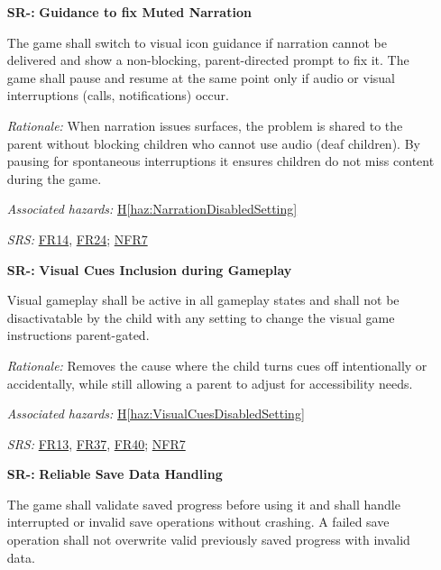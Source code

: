 \documentclass{article}
\newcounter{hazard}
\newcommand{\hazref}[1]{\hyperref[haz:#1]{H\ref*{haz:#1}}}
\newcounter{sr}
\newcommand{\srdef}[1]{\refstepcounter{sr}\label{sr:#1}\textbf{SR-\thesr:}}
\newcommand{\srsurl}{https://team-hindsight.github.io/ophthamology-game/SRS-IEEE/SRS.pdf}
\newcommand{\srsfrref}[2]{\href{\srsurl\#nameddest=#1}{FR#2}}
\newcommand{\srsnfrref}[2]{\href{\srsurl\#nameddest=#1}{NFR#2}}
\begin{document}
\begin{itemize}[leftmargin=1.5cm, labelwidth=1.3cm, labelsep=0.2cm,
  align=left, itemsep=1.2em, parsep=0.6em]
\textit{Rationale:}
Addresses the data-defect cause and removes quiz questions that don't 
match so the child never sees a question that cannot be answered correctly.

\textit{Associated hazards:}
\hazref{CorrectAnswerReveal}

\textit{SRS:} \srsfrref{FR_ValidQuestions}{16}

\item[\srdef{NarrationMuted}]
\textbf{Guidance to fix Muted Narration}

The game shall switch to visual icon guidance if narration cannot be 
delivered and show a non-blocking, parent-directed prompt to fix it. 
The game shall pause and resume at the same point only if audio or 
visual interruptions (calls, notifications) occur.

\textit{Rationale:}
When narration issues surfaces, the problem is shared to the parent without 
blocking children who cannot use audio (deaf children). By pausing for 
spontaneous interruptions it ensures children do not miss content during the game.

\textit{Associated hazards:}
\hazref{NarrationDisabledSetting}

\textit{SRS:} \srsfrref{FR_NarrationFallback}{14}, \srsfrref{FR_Suspend}{24}; \srsnfrref{NFR_Accessibility}{7}

\item[\srdef{VisualCuesSetting}]
\textbf{Visual Cues Inclusion during Gameplay}

Visual gameplay shall be active in all gameplay states and shall not be 
disactivatable by the child with any setting to change the visual game 
instructions parent-gated.

\textit{Rationale:}
Removes the cause where the child turns cues off intentionally or accidentally, 
while still allowing a parent to adjust for accessibility needs.

\textit{Associated hazards:}
\hazref{VisualCuesDisabledSetting}

\textit{SRS:} \srsfrref{FR_VisualCues}{13}, \srsfrref{FR_ParentGate}{37}, \srsfrref{FR_Preferences}{40}; \srsnfrref{NFR_Accessibility}{7}

\item[\srdef{ReliableSaveData}]
\textbf{Reliable Save Data Handling}

The game shall validate saved progress before
using it and shall handle interrupted or invalid
save operations without crashing. A failed save
operation shall not overwrite valid previously
saved progress with invalid data.


\end{itemize}
\end{document}
